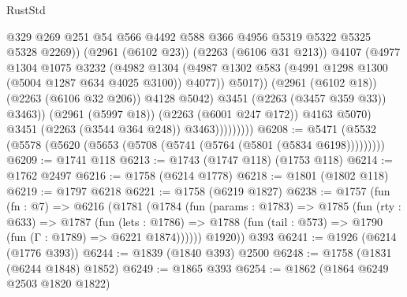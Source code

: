 \begin{lexlean}{RustStd}
\begin{coremodule}
{\begin{coremodule}
{{{{{{{{{{{{{{{                                    @329
                                    @269
                                    @251
                                    @54
                                    @566
                                    @4492
                                    @588
                                    @366
                                    @4956
                                    @5319
                                    @5322
                                    @5325
                                    @5328
                                    @2269))
                                (@2961 (@6102 @23))
                                (@2263 (@6106 @31 @213))
                                @4107
                                (@4977
                                  @1304
                                  @1075
                                  @3232
                                  (@4982
                                    @1304
                                    (@4987
                                      @1302
                                      @583
                                      (@4991 @1298 @1300 (@5004 @1287 @634 @4025 @3100))
                                      @4077))
                                  @5017))
                              (@2961 (@6102 @18))
                              (@2263 (@6106 @32 @206))
                              @4128
                              @5042)
                            @3451
                            (@2263 (@3457 @359 @33))
                            @3463))
                        (@2961 (@5997 @18))
                        (@2263 (@6001 @247 @172))
                        @4163
                        @5070)
                      @3451
                      (@2263 (@3544 @364 @248))
                      @3463)))))))))
@6208 := @5471 (@5532 (@5578 (@5620 (@5653 (@5708 (@5741 (@5764 (@5801 (@5834 @6198)))))))))
@6209 := @1741 @118
@6213 := @1743 (@1747 @118) (@1753 @118)
@6214 := @1762 @2497
@6216 := @1758 (@6214 @1778)
@6218 := @1801 (@1802 @118)
@6219 := @1797 @6218
@6221 := @1758 (@6219 @1827)
@6238 := @1757
    (fun (fn : @7) =>
    @6216
      (@1781
        (@1784
          (fun (params : @1783) =>
          @1785
            (fun (rty : @633) =>
            @1787
              (fun (lets : @1786) =>
              @1788 (fun (tail : @573) => @1790 (fun (Γ : @1789) => @6221 @1874))))))
        @1920))
    @393
@6241 := @1926 (@6214 (@1776 @393))
@6244 := @1839 (@1840 @393) @2500
@6248 := @1758 (@1831 (@6244 @1848) @1852)
@6249 := @1865 @393
@6254 := @1862 (@1864 @6249 @2503 @1820 @1822)
}}}}}}}}}}}}}}}
\end{coremodule}}
\end{coremodule}
\end{lexlean}
